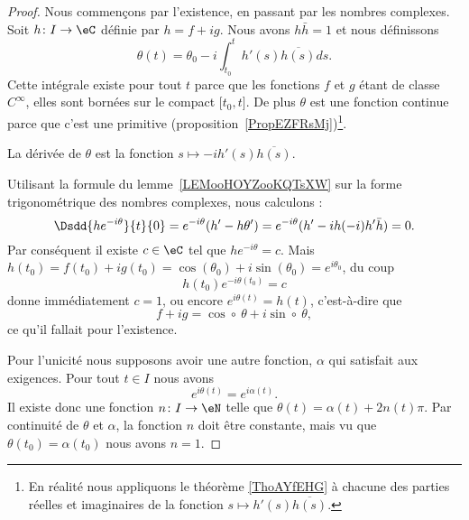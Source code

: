 	\begin{proof}
		Nous commençons par l'existence, en passant par les nombres complexes. Soit \( h\colon I\to \eC\) définie par \( h=f+ig\). Nous avons \( h\bar h=1\) et nous définissons
		\begin{equation}
			\theta(t)=\theta_0-i\int_{t_0}^th'(s)\overline{ h(s) }ds.
		\end{equation}
		Cette intégrale existe pour tout \( t\) parce que les fonctions \( f\) et \( g\) étant de classe \(  C^{\infty}\), elles sont bornées sur le compact \( \mathopen[ t_0 , t  \mathclose]\). De plus \( \theta\) est une fonction continue parce que c'est une primitive (proposition~\ref{PropEZFRsMj})\footnote{En réalité nous appliquons le théorème \ref{ThoAYfEHG} à chacune des parties réelles et imaginaires de la fonction \( s\mapsto h'(s)\overline{ h(s) }\).}.

		La dérivée de \( \theta\) est la fonction \( s\mapsto -i h'(s)\overline{ h(s) }\).

		Utilisant la formule du lemme~\ref{LEMooHOYZooKQTsXW} sur la forme trigonométrique des nombres complexes, nous calculons :
		\begin{equation}
			\Dsdd{ h e^{-i\theta} }{t}{0}= e^{-i\theta}(h'-h\theta')= e^{-i\theta}(h'-ih(-i)h'\bar h)=0.
		\end{equation}
		Par conséquent il existe \( c\in \eC\) tel que \( h e^{-i\theta}=c\). Mais \( h(t_0)=f(t_0)+ig(t_0)=\cos(\theta_0)+i\sin(\theta_0)= e^{i\theta_0}\), du coup
		\begin{equation}
			h(t_0) e^{-i\theta(t_0)}=c
		\end{equation}
		donne immédiatement \( c=1\), ou encore \(  e^{i\theta(t)}=h(t)\), c'est-à-dire que
		\begin{equation}
			f+ig=\cos\circ\ \theta+i\sin\circ\ \theta,
		\end{equation}
		ce qu'il fallait pour l'existence.

		Pour l'unicité nous supposons avoir une autre fonction, \(\alpha\) qui satisfait aux exigences. Pour tout \( t\in I\) nous avons
		\begin{equation}
			e^{i\theta(t)}= e^{i\alpha(t)}.
		\end{equation}
		Il existe donc une fonction \( n\colon I\to \eN\) telle que \( \theta(t)=\alpha(t)+2n(t)\pi\). Par continuité de \( \theta\) et \( \alpha\), la fonction \( n\) doit être constante, mais vu que \( \theta(t_0)=\alpha(t_0)\) nous avons \( n=1\).
	\end{proof}


